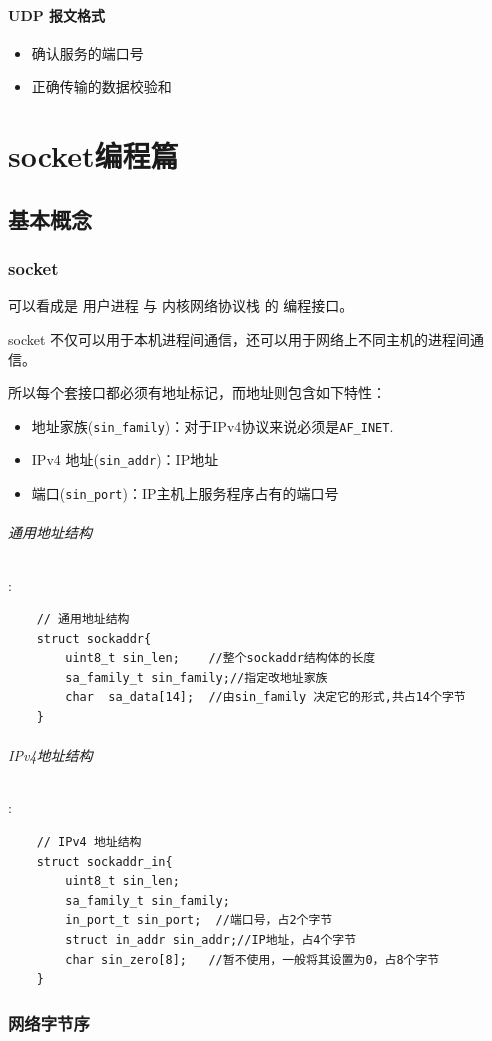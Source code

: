\documentclass[UTF8,a4paper,12pt]{ctexbook}
\begin{document}
			\subsubsection{UDP 报文格式}
				\begin{itemize}
					\item 确认服务的端口号
					\item 正确传输的数据校验和
				\end{itemize}

\chapter{socket编程篇}
	\section{基本概念}
		\subsection{socket}可以看成是 用户进程 与 内核网络协议栈 的 编程接口。
		
			socket 不仅可以用于本机进程间通信，还可以用于网络上不同主机的进程间通信。
			
			所以每个套接口都必须有地址标记，而地址则包含如下特性：
			\begin{itemize}
				\item 地址家族(\verb|sin_family|)：对于IPv4协议来说必须是\verb|AF_INET|.
				\item IPv4 地址(\verb|sin_addr|)：IP地址
				\item 端口(\verb|sin_port|)：IP主机上服务程序占有的端口号
			\end{itemize}

		\subparagraph{通用地址结构}:
			\begin{lstlisting}
	// 通用地址结构
	struct sockaddr{
		uint8_t sin_len;	//整个sockaddr结构体的长度
		sa_family_t sin_family;//指定改地址家族
		char  sa_data[14];	//由sin_family 决定它的形式,共占14个字节
	}			
			\end{lstlisting}
		\subparagraph{IPv4地址结构}:
			\begin{lstlisting}
	// IPv4 地址结构
	struct sockaddr_in{
		uint8_t sin_len;
		sa_family_t sin_family;
		in_port_t sin_port;  //端口号，占2个字节 
		struct in_addr sin_addr;//IP地址，占4个字节
		char sin_zero[8];	//暂不使用，一般将其设置为0，占8个字节
	}			
			\end{lstlisting}
		\subsection{网络字节序}
\end{document}
